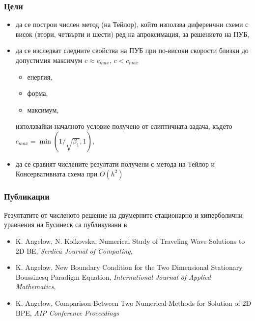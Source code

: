 \documentclass{beamer}
\begin{document}

\begin{frame}
\frametitle{Цели}

\begin{itemize}
  \item да се построи числен метод (на Тейлор), който използва диференчни схеми с висок (втори, четвърти и шести) ред на апроксимация, за решението на ПУБ,
  
     \item да се изследват следните свойства на ПУБ при по-високи скорости близки до допустимия максимум $c \approx c_{max}$, $c < c_{max}$
  \begin{itemize}
     \item енергия,
     \item форма,
     \item максимум,     
  \end{itemize}
	използвайки началното условие получено от елиптичната задача, където $c_{max} = \min (1/ \sqrt{\beta_1},1)$,

  \item да се сравнят числените резултати получени с метода на Тейлор и Консервативната схема при $O(h^2)$
    
\end{itemize}


\end{frame}


\begin{frame}
\frametitle{Публикации}

Резултатите от численото решение на двумерните стационарно и хиперболични уравнения на Бусинеск са
публикувани в
\begin{itemize}
  \item K. Angelow, N. Kolkovska, Numerical Study of Traveling Wave Solutions to 2D BE, {\it Serdica Journal of Computing},
  \item K. Angelow, New Boundary Condition for the Two Dimensional Stationary Boussinesq Paradigm Equation, {\it International Journal of Applied Mathematics},
   \item K. Angelow, Comparison Between Two Numerical Methods for Solution of 2D BPE, {\it AIP Conference Proceedings}
\end{itemize}

\end{frame}

\end{document}

